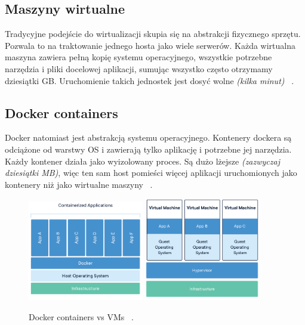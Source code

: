 \subsection{Maszyny wirtualne}

Tradycyjne podejście do wirtualizacji skupia się na abstrakcji fizycznego sprzętu. 
Pozwala to na traktowanie jednego hosta jako wiele serwerów. 
Każda wirtualna maszyna zawiera pełną kopię systemu operacyjnego, wszystkie potrzebne narzędzia i pliki docelowej aplikacji, sumując wszystko często otrzymamy dziesiątki GB.
Uruchomienie takich jednostek jest dosyć wolne {\em (kilka minut)} ~\cite{docker-c}.
    
\subsection{Docker containers}

Docker natomiast jest abstrakcją systemu operacyjnego. Kontenery dockera są odciążone od warstwy OS i zawierają tylko aplikację i potrzebne jej narzędzia.
Każdy kontener działa jako wyizolowany proces. Są dużo lżejsze {\em (zazwyczaj dziesiątki MB)}, 
więc ten sam host pomieści więcej aplikacji uruchomionych jako kontenery niż jako wirtualne maszyny ~\cite{docker-c}.

\begin{figure}[h!]
	\begin{center}
		\includegraphics[width=0.45\textwidth]{img/docker-layers}
		\hspace{5mm}
		\includegraphics[width=0.45\textwidth]{img/vm-layers}
	\end{center}
	\caption{Docker containers vs VMs ~\cite{docker-c}.}
	\label{fig:docker-vms}
\end{figure}

